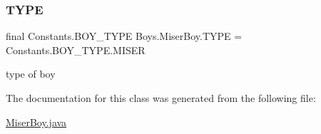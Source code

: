 \subsubsection{\texorpdfstring{T\+Y\+PE}{TYPE}}
{\footnotesize\ttfamily final Constants.\+B\+O\+Y\+\_\+\+T\+Y\+PE Boys.\+Miser\+Boy.\+T\+Y\+PE = Constants.\+B\+O\+Y\+\_\+\+T\+Y\+P\+E.\+M\+I\+S\+ER}

type of boy 

The documentation for this class was generated from the following file\+:\begin{DoxyCompactItemize}
\item 
\hyperlink{_miser_boy_8java}{Miser\+Boy.\+java}\end{DoxyCompactItemize}
